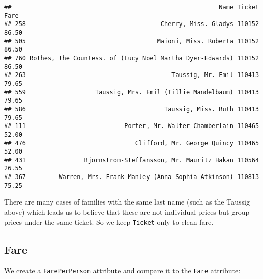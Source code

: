 \documentclass[]{article}
\begin{document}
\begin{verbatim}
##                                                         Name Ticket  Fare
## 258                                     Cherry, Miss. Gladys 110152 86.50
## 505                                    Maioni, Miss. Roberta 110152 86.50
## 760 Rothes, the Countess. of (Lucy Noel Martha Dyer-Edwards) 110152 86.50
## 263                                        Taussig, Mr. Emil 110413 79.65
## 559                   Taussig, Mrs. Emil (Tillie Mandelbaum) 110413 79.65
## 586                                      Taussig, Miss. Ruth 110413 79.65
## 111                           Porter, Mr. Walter Chamberlain 110465 52.00
## 476                              Clifford, Mr. George Quincy 110465 52.00
## 431                Bjornstrom-Steffansson, Mr. Mauritz Hakan 110564 26.55
## 367         Warren, Mrs. Frank Manley (Anna Sophia Atkinson) 110813 75.25
\end{verbatim}

There are many cases of families with the same last name (such as the
Taussig above) which leads us to believe that these are not individual
prices but group prices under the same ticket. So we keep
\texttt{Ticket} only to clean fare.

\subsection{Fare}\label{fare}

We create a \texttt{FarePerPerson} attribute and compare it to the
\texttt{Fare} attribute:
\end{document}
